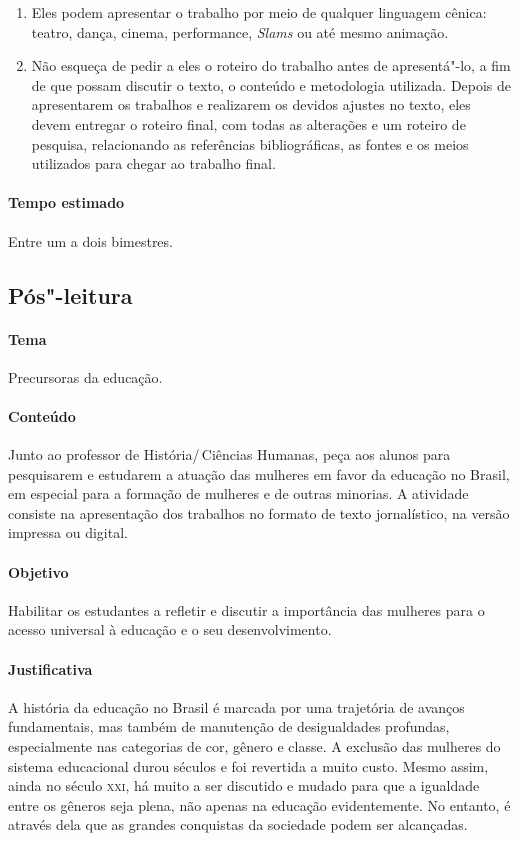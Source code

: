 \documentclass[12pt]{extarticle}
\begin{document}
\begin{enumerate}
\item
Eles podem apresentar o trabalho por meio de qualquer linguagem
cênica: teatro, dança, cinema, performance, \emph{Slams} ou até mesmo
animação.

\item
Não esqueça de pedir a eles o roteiro do trabalho antes de
apresentá"-lo, a fim de que possam discutir o texto, o conteúdo e
metodologia utilizada. Depois de apresentarem os trabalhos e realizarem
os devidos ajustes no texto, eles devem entregar o roteiro final, com
todas as alterações e um roteiro de pesquisa, relacionando as
referências bibliográficas, as fontes e os meios utilizados para chegar
ao trabalho final.
\end{enumerate}

\paragraph{Tempo estimado} Entre um a dois bimestres.


\subsection{Pós"-leitura}

\paragraph{Tema} Precursoras da educação.

\paragraph{Conteúdo} Junto ao professor de História/\,Ciências Humanas, 
peça aos alunos para pesquisarem e estudarem a atuação das mulheres em favor da
educação no Brasil, em especial para a formação de mulheres e de outras
minorias. A atividade consiste na apresentação dos trabalhos no formato
de texto jornalístico, na versão impressa ou digital.

\paragraph{Objetivo} Habilitar os estudantes a refletir e discutir a
importância das mulheres para o acesso universal à educação e o seu
desenvolvimento.

\paragraph{Justificativa} A história da educação no Brasil é marcada por
uma trajetória de avanços fundamentais, mas também de manutenção de
desigualdades profundas, especialmente nas categorias de cor, gênero e
classe. A exclusão das mulheres do sistema educacional durou séculos e
foi revertida a muito custo. Mesmo assim, ainda no século \textsc{xxi}, há muito
a ser discutido e mudado para que a igualdade entre os gêneros seja
plena, não apenas na educação evidentemente. No entanto, é através dela
que as grandes conquistas da sociedade podem ser alcançadas.
\end{document}
